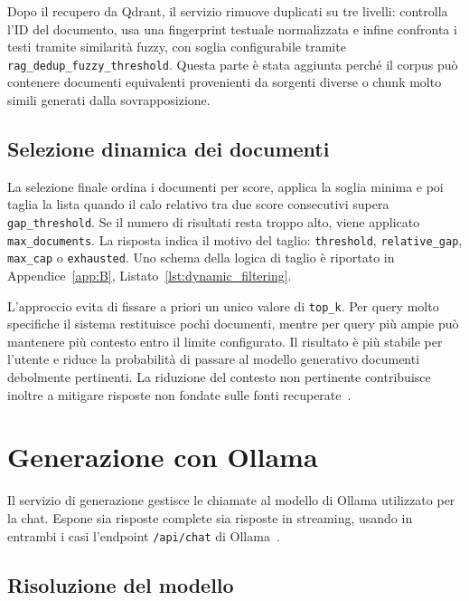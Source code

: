 Dopo il recupero da Qdrant, il servizio rimuove duplicati su tre livelli:
controlla l'ID del documento, usa una fingerprint testuale normalizzata e infine
confronta i testi tramite similarità fuzzy, con soglia configurabile tramite
\texttt{rag\_dedup\_fuzzy\_threshold}. Questa parte è stata aggiunta perché il
corpus può contenere documenti equivalenti provenienti da sorgenti diverse o
chunk molto simili generati dalla sovrapposizione.

\subsection{Selezione dinamica dei documenti}
\label{subsec:implementation_dynamic_filtering}

La selezione finale ordina i documenti per score, applica la soglia minima e poi
taglia la lista quando il calo relativo tra due score consecutivi supera
\texttt{gap\_threshold}. Se il numero di risultati resta troppo alto, viene
applicato \texttt{max\_documents}. La risposta indica il motivo del taglio:
\texttt{threshold}, \texttt{relative\_gap}, \texttt{max\_cap} o
\texttt{exhausted}. Uno schema della logica di taglio è riportato in
Appendice~\ref{app:B}, Listato~\ref{lst:dynamic_filtering}.

L'approccio evita di fissare a priori un unico valore di \texttt{top\_k}. Per
query molto specifiche il sistema restituisce pochi documenti, mentre per query
più ampie può mantenere più contesto entro il limite configurato. Il risultato è
più stabile per l'utente e riduce la probabilità di passare al modello
generativo documenti debolmente pertinenti. La riduzione del contesto non
pertinente contribuisce inoltre a mitigare risposte non fondate sulle fonti
recuperate~\cite{shuster2021retrieval}.

\section{Generazione con Ollama}
\label{sec:implementation_generation}

Il servizio di generazione gestisce le chiamate al modello di Ollama utilizzato per la chat. 
Espone sia risposte complete sia risposte in streaming, usando in entrambi i casi
l'endpoint \texttt{/api/chat} di Ollama~\cite{ollama2023}.

\subsection{Risoluzione del modello}
\label{subsec:implementation_model_resolution}

